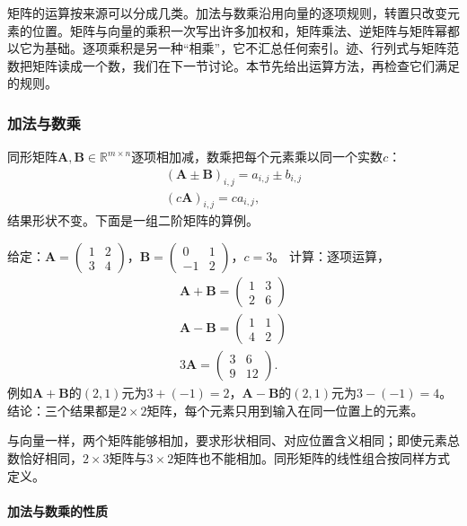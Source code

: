 矩阵的运算按来源可以分成几类。加法与数乘沿用向量的逐项规则，转置只改变元素的位置。矩阵与向量的乘积一次写出许多加权和，矩阵乘法、逆矩阵与矩阵幂都以它为基础。逐项乘积是另一种“相乘”，它不汇总任何索引。迹、行列式与矩阵范数把矩阵读成一个数，我们在下一节讨论。本节先给出运算方法，再检查它们满足的规则。

\subsubsection{加法与数乘}

同形矩阵$\bm A,\bm B\in\mathbb R^{m\times n}$逐项相加减，数乘把每个元素乘以同一个实数$c$：
\[
 \begin{gathered}
(\bm A\pm\bm B)_{i,j}=a_{i,j}\pm b_{i,j}\\
(c\bm A)_{i,j}=ca_{i,j},
 \end{gathered}
\]
结果形状不变。下面是一组二阶矩阵的算例。
\begin{example}
\label{ex:ls-matrix-addition-scaling}
给定：$\bm A=\left(\begin{smallmatrix}1&2\\3&4\end{smallmatrix}\right)$，$\bm B=\left(\begin{smallmatrix}0&1\\-1&2\end{smallmatrix}\right)$，$c=3$。
计算：逐项运算，
\[
\begin{gathered}
\bm A+\bm B=\begin{pmatrix}1&3\\2&6\end{pmatrix}\\
\bm A-\bm B=\begin{pmatrix}1&1\\4&2\end{pmatrix}\\
3\bm A=\begin{pmatrix}3&6\\9&12\end{pmatrix}.
\end{gathered}
\]
例如$\bm A+\bm B$的$(2,1)$元为$3+(-1)=2$，$\bm A-\bm B$的$(2,1)$元为$3-(-1)=4$。
结论：三个结果都是$2\times2$矩阵，每个元素只用到输入在同一位置上的元素。
\end{example}
与向量一样，两个矩阵能够相加，要求形状相同、对应位置含义相同；即使元素总数恰好相同，$2\times3$矩阵与$3\times2$矩阵也不能相加。同形矩阵的线性组合按同样方式定义。

\paragraph{加法与数乘的性质}

